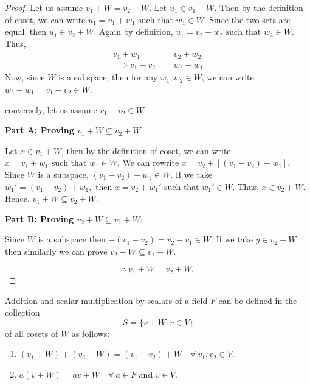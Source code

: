 \documentclass[12pt, a4paper]{article}
\theoremstyle{definition}
\theoremstyle{remark}
\newcommand{\st}{\text{ such that }}
\begin{document}
	\begin{proof}
		Let us assume $v_1 + W = v_2 + W$. Let $u_1 \in v_1 + W$. Then by the definition of coset, we can write $u_1 = v_1 + w_1 \st w_1 \in W$. Since the two sets are equal, then $u_1 \in v_2 + W$. Again by definition, $u_1 = v_2 + w_2 \st w_2 \in W$. Thus,
		\begin{align*}
			v_1 + w_1 &= v_2 + w_2 \\
			\implies v_1 - v_2 &= w_2 - w_1
		\end{align*}
		Now, since $W$ is a subspace, then for any $w_1, w_2 \in W$, we can write $w_2 - w_1 = v_1 - v_2 \in W$.
		
		conversely, let us assume $v_1-v_2 \in W$.
		
		\vspace{0.3cm}
		
		\noindent \textbf{Part A: Proving $v_1+W \subseteq v_2+W$}:
		
		\vspace{0.3cm}
		
		\noindent Let $x \in v_1 + W$, then by the definition of coset, we can write $x = v_1 + w_1 \st w_1 \in W$. We can rewrite $x = v_2 + [(v_1-v_2)+w_1]$. Since $W$ is a subspace, $(v_1-v_2)+w_1 \in W$. If we take $w_1' = (v_1-v_2)+w_1, \text{ then } x = v_2+w_1' \st w_1' \in W$. Thus, $x \in v_2+W$. Hence, $v_1+W \subseteq v_2+W$.
		
		\vspace{0.3cm}
		
		\noindent \textbf{Part B: Proving $v_2+W \subseteq v_1+W$}:
		
		\vspace{0.3cm}
		
		\noindent Since $W$ is a subspace then $-(v_1-v_2) = v_2-v_1 \in W$. If we take $y \in v_2+W$ then similarly we can prove $v_2+W \subseteq v_1+W$.
		
		\[
		\therefore \ v_1 + W = v_2 + W.
		\]
	\end{proof}
	
	\noindent Addition and scalar multiplication by scalars of a field $F$ can be defined in the collection
	\[
	S = \{v+W : v \in V\}
	\]
	of all cosets of $W$ as follows:
	\begin{enumerate}
		\item $(v_1+W)+(v_2+W) = (v_1+v_2)+W \quad \forall \ v_1, v_2 \in V$.
		\item $a(v+W) = av+W \quad \forall \ a \in F \text{ and } v \in V$.
	\end{enumerate}
	
\end{document}
